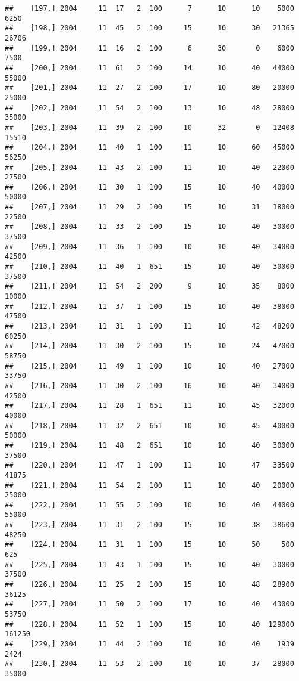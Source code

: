 \documentclass{article}\usepackage[]{graphicx}\usepackage[]{color}
\makeatletter
\newenvironment{kframe}{%
 \def\at@end@of@kframe{}%
 \ifinner\ifhmode%
  \def\at@end@of@kframe{\end{minipage}}%
  \begin{minipage}{\columnwidth}%
 \fi\fi%
 \def\FrameCommand##1{\hskip\@totalleftmargin \hskip-\fboxsep
 \colorbox{shadecolor}{##1}\hskip-\fboxsep
     \hskip-\linewidth \hskip-\@totalleftmargin \hskip\columnwidth}%
 \MakeFramed {\advance\hsize-\width
   \@totalleftmargin\z@ \linewidth\hsize
   \@setminipage}}%
 {\par\unskip\endMakeFramed%
 \at@end@of@kframe}
\newenvironment{knitrout}{}{} %
\makeatother
\begin{document}
\begin{knitrout}
\begin{kframe}
\begin{verbatim}
##    [197,] 2004     11  17   2  100      7      10      10    5000    6250
##    [198,] 2004     11  45   2  100     15      10      30   21365   26706
##    [199,] 2004     11  16   2  100      6      30       0    6000    7500
##    [200,] 2004     11  61   2  100     14      10      40   44000   55000
##    [201,] 2004     11  27   2  100     17      10      80   20000   25000
##    [202,] 2004     11  54   2  100     13      10      48   28000   35000
##    [203,] 2004     11  39   2  100     10      32       0   12408   15510
##    [204,] 2004     11  40   1  100     11      10      60   45000   56250
##    [205,] 2004     11  43   2  100     11      10      40   22000   27500
##    [206,] 2004     11  30   1  100     15      10      40   40000   50000
##    [207,] 2004     11  29   2  100     15      10      31   18000   22500
##    [208,] 2004     11  33   2  100     15      10      40   30000   37500
##    [209,] 2004     11  36   1  100     10      10      40   34000   42500
##    [210,] 2004     11  40   1  651     15      10      40   30000   37500
##    [211,] 2004     11  54   2  200      9      10      35    8000   10000
##    [212,] 2004     11  37   1  100     15      10      40   38000   47500
##    [213,] 2004     11  31   1  100     11      10      42   48200   60250
##    [214,] 2004     11  30   2  100     15      10      24   47000   58750
##    [215,] 2004     11  49   1  100     10      10      40   27000   33750
##    [216,] 2004     11  30   2  100     16      10      40   34000   42500
##    [217,] 2004     11  28   1  651     11      10      45   32000   40000
##    [218,] 2004     11  32   2  651     10      10      45   40000   50000
##    [219,] 2004     11  48   2  651     10      10      40   30000   37500
##    [220,] 2004     11  47   1  100     11      10      47   33500   41875
##    [221,] 2004     11  54   2  100     11      10      40   20000   25000
##    [222,] 2004     11  55   2  100     10      10      40   44000   55000
##    [223,] 2004     11  31   2  100     15      10      38   38600   48250
##    [224,] 2004     11  31   1  100     15      10      50     500     625
##    [225,] 2004     11  43   1  100     15      10      40   30000   37500
##    [226,] 2004     11  25   2  100     15      10      48   28900   36125
##    [227,] 2004     11  50   2  100     17      10      40   43000   53750
##    [228,] 2004     11  52   1  100     15      10      40  129000  161250
##    [229,] 2004     11  44   2  100     10      10      40    1939    2424
##    [230,] 2004     11  53   2  100     10      10      37   28000   35000

\end{verbatim}
\end{kframe}
\end{knitrout}
\end{document}

